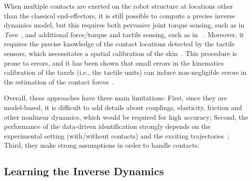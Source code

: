       When multiple contacts are exerted on the robot structure at locations other than the classical end-effectors, it is still possible to compute a precise inverse dynamics model, but this requires both pervasive joint torque sensing, such as in \textit{Toro}~\cite{Ogawa2014}, and additional force/torque and tactile sensing, such as in \robot{}~\cite{Ivaldi2011}.
      Moreover, it requires the precise knowledge of the contact locations detected by the tactile sensors, which necessitates a spatial calibration of the skin~\cite{DelPrete2011}. 
      This procedure is prone to errors, and it has been shown that small errors in the kinematics calibration of the taxels (i.e., the tactile units) can induce non-negligible errors in the estimation of the contact forces~\cite{DelPrete2012}.

      Overall, these approaches have three main limitations: 
      First, since they are model-based, it is difficult to add details about couplings, elasticity, friction and other nonlinear dynamics, which would be required for high accuracy; 
      Second, the performance of the data-driven identification strongly depends on the experimental setting (with/without contacts) and the exciting trajectories~\cite{Pedrocchi2014}; 
      Third, they make strong assumptions in order to handle contacts.




\subsection{Learning the Inverse Dynamics}

